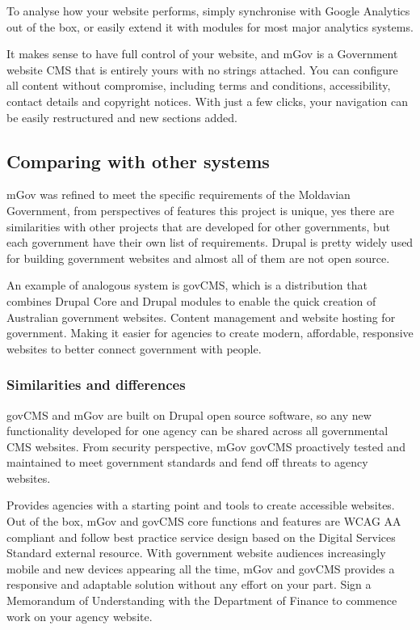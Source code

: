 To analyse how your website performs, simply synchronise with Google Analytics out of the box, or easily extend it with modules for most major analytics systems.

It makes sense to have full control of your website, and mGov is a Government website CMS that is entirely yours with no strings attached. You can configure all content without compromise, including terms and conditions, accessibility, contact details and copyright notices. With just a few clicks, your navigation can be easily restructured and new sections added.

\subsection{Comparing with other systems}
mGov was refined to meet the specific requirements of the Moldavian Government, from perspectives of features this project is unique, yes there are similarities with other projects that are developed for other governments, but each government have their own list of requirements. Drupal is pretty widely used for building government websites and almost all of them are not open source. 

An example of analogous system is govCMS, which is a distribution that combines Drupal Core and Drupal modules to enable the quick creation of Australian government websites. Content management and website hosting for government. Making it easier for agencies to create modern, affordable, responsive websites to better connect government with people.

\subsubsection{Similarities and differences}
govCMS and mGov are built on Drupal open source software, so any new functionality developed for one agency can be shared across all governmental CMS websites. From security perspective, mGov govCMS proactively tested and maintained to meet government standards and fend off threats to agency websites. 

Provides agencies with a starting point and tools to create accessible websites. Out of the box, mGov and govCMS core functions and features are WCAG AA compliant and follow best practice service design based on the Digital Services Standard external resource. With government website audiences increasingly mobile and new devices appearing all the time, mGov and govCMS provides a responsive and adaptable solution without any effort on your part. Sign a Memorandum of Understanding with the Department of Finance to commence work on your agency website.

